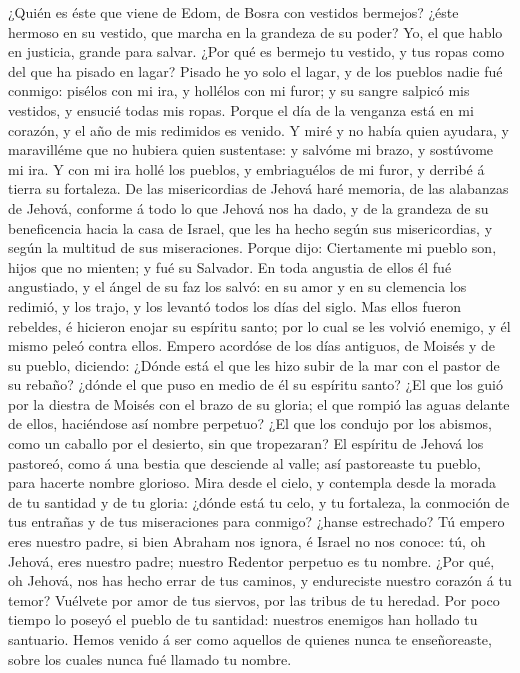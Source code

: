  ¿Quién es éste que viene de Edom, de Bosra con vestidos
bermejos? ¿éste hermoso en su vestido, que marcha en la grandeza de su
poder? Yo, el que hablo en justicia, grande para salvar. 
¿Por qué es bermejo tu vestido, y tus ropas como del que ha pisado en
lagar?  Pisado he yo solo el lagar, y de los pueblos nadie
fué conmigo: pisélos con mi ira, y hollélos con mi furor; y su sangre
salpicó mis vestidos, y ensucié todas mis ropas.  Porque
el día de la venganza está en mi corazón, y el año de mis redimidos es
venido.  Y miré y no había quien ayudara, y maravilléme
que no hubiera quien sustentase: y salvóme mi brazo, y sostúvome mi ira.
 Y con mi ira hollé los pueblos, y embriaguélos de mi
furor, y derribé á tierra su fortaleza.  De las
misericordias de Jehová haré memoria, de las alabanzas de Jehová,
conforme á todo lo que Jehová nos ha dado, y de la grandeza de su
beneficencia hacia la casa de Israel, que les ha hecho según sus
misericordias, y según la multitud de sus miseraciones. 
Porque dijo: Ciertamente mi pueblo son, hijos que no mienten; y fué su
Salvador.  En toda angustia de ellos él fué angustiado, y
el ángel de su faz los salvó: en su amor y en su clemencia los redimió,
y los trajo, y los levantó todos los días del siglo.  Mas
ellos fueron rebeldes, é hicieron enojar su espíritu santo; por lo cual
se les volvió enemigo, y él mismo peleó contra ellos. 
Empero acordóse de los días antiguos, de Moisés y de su pueblo,
diciendo: ¿Dónde está el que les hizo subir de la mar con el pastor de
su rebaño? ¿dónde el que puso en medio de él su espíritu santo?
 ¿El que los guió por la diestra de Moisés con el brazo
de su gloria; el que rompió las aguas delante de ellos, haciéndose así
nombre perpetuo?  ¿El que los condujo por los abismos,
como un caballo por el desierto, sin que tropezaran?  El
espíritu de Jehová los pastoreó, como á una bestia que desciende al
valle; así pastoreaste tu pueblo, para hacerte nombre glorioso.
 Mira desde el cielo, y contempla desde la morada de tu
santidad y de tu gloria: ¿dónde está tu celo, y tu fortaleza, la
conmoción de tus entrañas y de tus miseraciones para conmigo? ¿hanse
estrechado?  Tú empero eres nuestro padre, si bien
Abraham nos ignora, é Israel no nos conoce: tú, oh Jehová, eres nuestro
padre; nuestro Redentor perpetuo es tu nombre.  ¿Por qué,
oh Jehová, nos has hecho errar de tus caminos, y endureciste nuestro
corazón á tu temor? Vuélvete por amor de tus siervos, por las tribus de
tu heredad.  Por poco tiempo lo poseyó el pueblo de tu
santidad: nuestros enemigos han hollado tu santuario. 
Hemos venido á ser como aquellos de quienes nunca te enseñoreaste, sobre
los cuales nunca fué llamado tu nombre.


